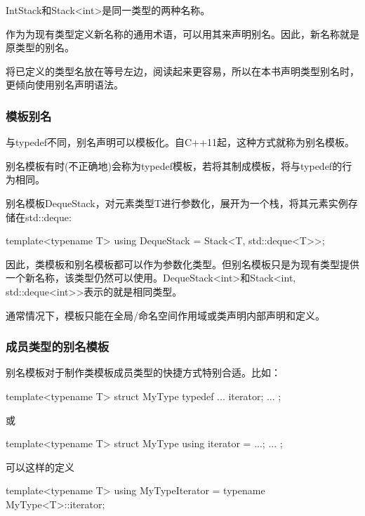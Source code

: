 IntStack和Stack<int>是同一类型的两种名称。

作为为现有类型定义新名称的通用术语，可以用其来声明别名。因此，新名称就是原类型的别名。

将已定义的类型名放在等号左边，阅读起来更容易，所以在本书声明类型别名时，更倾向使用别名声明语法。

\subsubsection{模板别名}

与typedef不同，别名声明可以模板化。自C++11起，这种方式就称为别名模板。

\begin{notice}别名模板有时(不正确地)会称为typedef模板，若将其制成模板，将与typedef的行为相同。
\end{notice}

别名模板DequeStack，对元素类型T进行参数化，展开为一个栈，将其元素实例存储在std::deque:

\begin{cpp}
template<typename T>
using DequeStack = Stack<T, std::deque<T>>;
\end{cpp}

因此，类模板和别名模板都可以作为参数化类型。但别名模板只是为现有类型提供一个新名称，该类型仍然可以使用。DequeStack<int>和Stack<int, std::deque<int>>表示的就是相同类型。

通常情况下，模板只能在全局/命名空间作用域或类声明内部声明和定义。

\subsubsection{成员类型的别名模板}

别名模板对于制作类模板成员类型的快捷方式特别合适。比如：

\begin{cpp}
template<typename T> struct MyType {
	typedef ... iterator;
	...
};
\end{cpp}

或

\begin{cpp}
template<typename T> struct MyType {
	using iterator = ...;
	...
};
\end{cpp}

可以这样的定义

\begin{cpp}
template<typename T>
using MyTypeIterator = typename MyType<T>::iterator;
\end{cpp}


